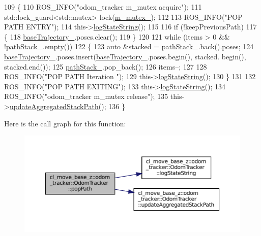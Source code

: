 \begin{DoxyCode}
109 \{
110     ROS\_INFO(\textcolor{stringliteral}{"odom\_tracker m\_mutex acquire"});
111     std::lock\_guard<std::mutex> lock(\hyperlink{classcl__move__base__z_1_1odom__tracker_1_1OdomTracker_aa371639e1eee269273dec8d3ab9dba0f}{m\_mutex\_});
112 
113     ROS\_INFO(\textcolor{stringliteral}{"POP PATH ENTRY"});
114     this->\hyperlink{classcl__move__base__z_1_1odom__tracker_1_1OdomTracker_a6d0b450474d9d555205ff4281965164e}{logStateString}();
115 
116     \textcolor{keywordflow}{if} (!keepPreviousPath)
117     \{
118         \hyperlink{classcl__move__base__z_1_1odom__tracker_1_1OdomTracker_a466d18a86df049f0f680e043bb5ea91f}{baseTrajectory\_}.poses.clear();
119     \}
120 
121     \textcolor{keywordflow}{while} (items > 0 && !\hyperlink{classcl__move__base__z_1_1odom__tracker_1_1OdomTracker_a1ccad1b568b6c65da43ba6639b6bd1ef}{pathStack\_}.empty())
122     \{
123         \textcolor{keyword}{auto} &stacked = \hyperlink{classcl__move__base__z_1_1odom__tracker_1_1OdomTracker_a1ccad1b568b6c65da43ba6639b6bd1ef}{pathStack\_}.back().poses;
124         \hyperlink{classcl__move__base__z_1_1odom__tracker_1_1OdomTracker_a466d18a86df049f0f680e043bb5ea91f}{baseTrajectory\_}.poses.insert(\hyperlink{classcl__move__base__z_1_1odom__tracker_1_1OdomTracker_a466d18a86df049f0f680e043bb5ea91f}{baseTrajectory\_}.poses.begin(), stacked.
      begin(), stacked.end());
125         \hyperlink{classcl__move__base__z_1_1odom__tracker_1_1OdomTracker_a1ccad1b568b6c65da43ba6639b6bd1ef}{pathStack\_}.pop\_back();
126         items--;
127 
128         ROS\_INFO(\textcolor{stringliteral}{"POP PATH Iteration "});
129         this->\hyperlink{classcl__move__base__z_1_1odom__tracker_1_1OdomTracker_a6d0b450474d9d555205ff4281965164e}{logStateString}();
130     \}
131 
132     ROS\_INFO(\textcolor{stringliteral}{"POP PATH EXITING"});
133     this->\hyperlink{classcl__move__base__z_1_1odom__tracker_1_1OdomTracker_a6d0b450474d9d555205ff4281965164e}{logStateString}();
134     ROS\_INFO(\textcolor{stringliteral}{"odom\_tracker m\_mutex release"});
135     this->\hyperlink{classcl__move__base__z_1_1odom__tracker_1_1OdomTracker_a7922f1e1e688a2ed62d32d9914985a9f}{updateAggregatedStackPath}();
136 \}
\end{DoxyCode}
Here is the call graph for this function\+:
\nopagebreak
\begin{figure}[H]
\begin{center}
\leavevmode
\includegraphics[width=350pt]{classcl__move__base__z_1_1odom__tracker_1_1OdomTracker_a2749e5cd0443423d50864a0166b078b9_cgraph}
\end{center}
\end{figure}
